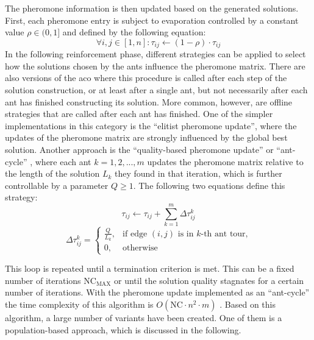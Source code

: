 The pheromone information is then updated based on the generated solutions. First, each pheromone entry is subject to evaporation controlled by a constant value $\rho \in (0,1]$ and defined by the following equation:
\begin{equation}
	\label{eq:aco_evap}
	\forall i,j \in [1,n]: \tau_{ij} \leftarrow (1-\rho) \cdot \tau_{ij}
\end{equation}
In the following reinforcement phase, different strategies can be applied to select how the solutions chosen by the ants influence the pheromone matrix. There are also versions of the \gls{aco} where this procedure is called after each step of the solution construction, or at least after a single ant, but not necessarily after each ant has finished constructing its solution. More common, however, are offline strategies that are called after each ant has finished. One of the simpler implementations in this category is the \enquote{elitist pheromone update}, where the updates of the pheromone matrix are strongly influenced by the global best solution. Another approach is the \enquote{quality-based pheromone update} or \enquote{ant-cycle} \cite{dorigo1996ant}, where each ant $k = 1,2,...,m$ updates the pheromone matrix relative to the length of the solution $L_k$ they found in that iteration, which is further controllable by a parameter $Q \geq 1$. The following two equations define this strategy:
\begin{equation}
	\tau_{ij} \leftarrow \tau_{ij} + \sum_{k=1}^{m} \Delta\tau_{ij}^k 
\end{equation}
\begin{equation}
	\Delta\tau_{ij}^k = \begin{cases}
		\frac{Q}{L_k}, &\text{if edge } (i,j) \text{ is in $k$-th ant tour,} \\
		0, &\text{otherwise}
	\end{cases}
\end{equation}

This loop is repeated until a termination criterion is met. This can be a fixed number of iterations $\text{NC}_{\text{MAX}}$ or until the solution quality stagnates for a certain number of iterations. With the pheromone update implemented as an \enquote{ant-cycle} the time complexity of this algorithm is $O(\text{NC}\cdot n^2 \cdot m)$ \cite{dorigo1996ant}. Based on this algorithm, a large number of variants have been created. One of them is a population-based approach, which is discussed in the following.

